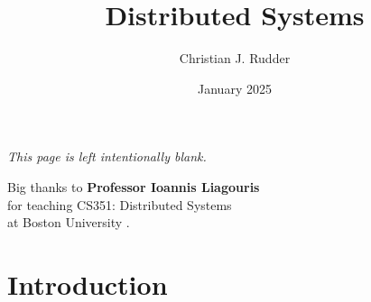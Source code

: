 \documentclass{memoir}
\title{Distributed Systems}
\author{Christian J. Rudder}
\date{January 2025}
\begin{document}
\maketitle
\setcounter{tocdepth}{2}

\tableofcontents

\newpage
\thispagestyle{empty}
\mbox{}
\vfill
\begin{center}
    \textit{This page is left intentionally blank.}
\end{center}
\vfill
\newpage
\thispagestyle{empty}
\mbox{}
\vfill
\begin{center}
    \Large{Big thanks to \textbf{Professor Ioannis Liagouris}}\\
    \normalsize 
    for teaching CS351: Distributed Systems\\
    at Boston University \cite{liagouris_cs351}.\\
\end{center}

\vfill

\chapter{Introduction}



\end{document}
